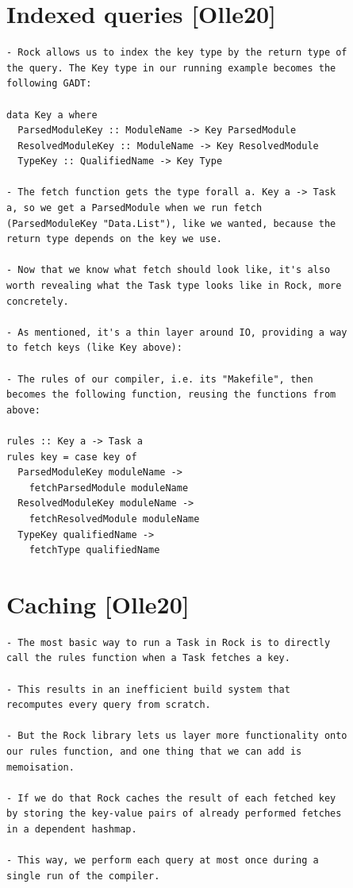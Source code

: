 \documentclass[12pt, a4paper]{report}
\begin{document}
\section*{Indexed queries [Olle20]}

\begin{verbatim}
- Rock allows us to index the key type by the return type of
the query. The Key type in our running example becomes the
following GADT:

data Key a where
  ParsedModuleKey :: ModuleName -> Key ParsedModule
  ResolvedModuleKey :: ModuleName -> Key ResolvedModule
  TypeKey :: QualifiedName -> Key Type

- The fetch function gets the type forall a. Key a -> Task
a, so we get a ParsedModule when we run fetch
(ParsedModuleKey "Data.List"), like we wanted, because the
return type depends on the key we use.

- Now that we know what fetch should look like, it's also
worth revealing what the Task type looks like in Rock, more
concretely.

- As mentioned, it's a thin layer around IO, providing a way
to fetch keys (like Key above):

- The rules of our compiler, i.e. its "Makefile", then
becomes the following function, reusing the functions from
above:

rules :: Key a -> Task a
rules key = case key of
  ParsedModuleKey moduleName ->
    fetchParsedModule moduleName
  ResolvedModuleKey moduleName ->
    fetchResolvedModule moduleName
  TypeKey qualifiedName ->
    fetchType qualifiedName
\end{verbatim}
\cite{olle_query_based}

\section*{Caching [Olle20]}

\begin{verbatim}
- The most basic way to run a Task in Rock is to directly
call the rules function when a Task fetches a key.

- This results in an inefficient build system that
recomputes every query from scratch.

- But the Rock library lets us layer more functionality onto
our rules function, and one thing that we can add is
memoisation.

- If we do that Rock caches the result of each fetched key
by storing the key-value pairs of already performed fetches
in a dependent hashmap.

- This way, we perform each query at most once during a
single run of the compiler.
\end{verbatim}
\cite{olle_query_based}
\end{document}
